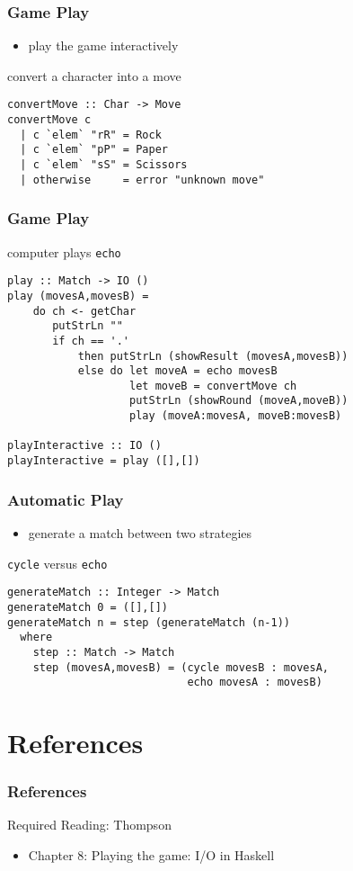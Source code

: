 \documentclass[dvipsnames]{beamer}
\theoremstyle{plain}
\begin{document}
\begin{frame}[fragile]
  \frametitle{Game Play}

  \begin{itemize}
    \item play the game interactively
  \end{itemize}

  \begin{exampleblock}{convert a character into a move}
    \begin{lstlisting}
convertMove :: Char -> Move
convertMove c
  | c `elem` "rR" = Rock
  | c `elem` "pP" = Paper
  | c `elem` "sS" = Scissors
  | otherwise     = error "unknown move"
    \end{lstlisting}
  \end{exampleblock}
\end{frame}

\begin{frame}[fragile]
  \frametitle{Game Play}

  \begin{exampleblock}{computer plays \lstinline{echo}}
    \begin{lstlisting}
play :: Match -> IO ()
play (movesA,movesB) =
    do ch <- getChar
       putStrLn ""
       if ch == '.'
           then putStrLn (showResult (movesA,movesB))
           else do let moveA = echo movesB
                   let moveB = convertMove ch
                   putStrLn (showRound (moveA,moveB))
                   play (moveA:movesA, moveB:movesB)

playInteractive :: IO ()
playInteractive = play ([],[])
    \end{lstlisting}
  \end{exampleblock}
\end{frame}

\begin{frame}[fragile]
  \frametitle{Automatic Play}

  \begin{itemize}
    \item generate a match between two strategies
  \end{itemize}

  \begin{exampleblock}{\lstinline{cycle} versus \lstinline{echo}}
    \begin{lstlisting}
generateMatch :: Integer -> Match
generateMatch 0 = ([],[])
generateMatch n = step (generateMatch (n-1))
  where
    step :: Match -> Match
    step (movesA,movesB) = (cycle movesB : movesA,
                            echo movesA : movesB)
    \end{lstlisting}
  \end{exampleblock}
\end{frame}

\section*{References}

\begin{frame}
  \frametitle{References}

  \begin{block}{Required Reading: Thompson}
    \begin{itemize}
      \item Chapter 8: \alert{Playing the game: I/O in Haskell}
    \end{itemize}
  \end{block}
\end{frame}
\end{document}
